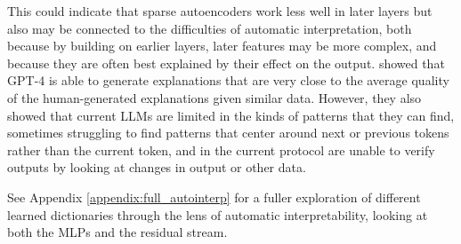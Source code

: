 This could indicate that sparse autoencoders work less well in later layers but also may be connected to the difficulties of automatic interpretation, both because by building on earlier layers, later features may be more complex, and because they are often best explained by their effect on the output. \citet{bills2023language} showed that GPT-4 is able to generate explanations that are very close to the average quality of the human-generated explanations given similar data. However, they also showed that current LLMs are limited in the kinds of patterns that they can find, sometimes struggling to find patterns that center around next or previous tokens rather than the current token, and in the current protocol are unable to verify outputs by looking at changes in output or other data. 


See Appendix \ref{appendix:full_autointerp} for a fuller exploration of different learned dictionaries through the lens of automatic interpretability, looking at both the MLPs and the residual stream.